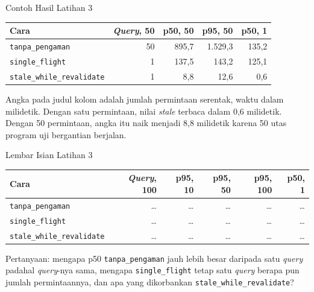 \documentclass[aspectratio=169, table, 12pt]{beamer}
\begin{document}
\begin{frame}{{\Large Contoh Hasil Latihan 3}}
  \vspace{6pt}
  \centering
  {\small
  \begin{tabularx}{\textwidth}{Xrrrr}
    \hline
    \textbf{Cara} & \textbf{\textit{Query}, 50} & \textbf{p50, 50} & \textbf{p95, 50} & \textbf{p50, 1} \\
    \hline
    \texttt{tanpa\_pengaman} & 50 & 895,7 & 1.529,3 & 135,2 \\
    \hline
    \texttt{single\_flight} & 1 & 137,5 & 143,2 & 125,1 \\
    \hline
    \texttt{stale\_while\_revalidate} & 1 & 8,8 & 12,6 & 0,6 \\
    \hline
  \end{tabularx}}

  \vspace{8pt}
  {\footnotesize Angka pada judul kolom adalah jumlah permintaan serentak, waktu
  dalam milidetik. Dengan satu permintaan, nilai \textit{stale} terbaca dalam 0,6
  milidetik. Dengan 50 permintaan, angka itu naik menjadi 8,8 milidetik karena
  50 utas program uji bergantian berjalan.}
\end{frame}

\begin{frame}{{\Large Lembar Isian Latihan 3}}
  \vspace{6pt}
  \centering
  {\small
  \begin{tabularx}{\textwidth}{Xrrrrr}
    \hline
    \textbf{Cara} & \textbf{\textit{Query}, 100} & \textbf{p95, 10} & \textbf{p95, 50} & \textbf{p95, 100} & \textbf{p50, 1} \\
    \hline
    \texttt{tanpa\_pengaman} & \dots & \dots & \dots & \dots & \dots \\
    \hline
    \texttt{single\_flight} & \dots & \dots & \dots & \dots & \dots \\
    \hline
    \texttt{stale\_while\_revalidate} & \dots & \dots & \dots & \dots & \dots \\
    \hline
  \end{tabularx}}

  \vspace{8pt}
  {\footnotesize Pertanyaan: mengapa p50 \texttt{tanpa\_pengaman} jauh lebih
  besar daripada satu \textit{query} padahal \textit{query}-nya sama, mengapa \texttt{single\_flight}
  tetap satu \textit{query} berapa pun jumlah permintaannya, dan apa yang dikorbankan
  \texttt{stale\_while\_revalidate}?}
\end{frame}
\end{document}
